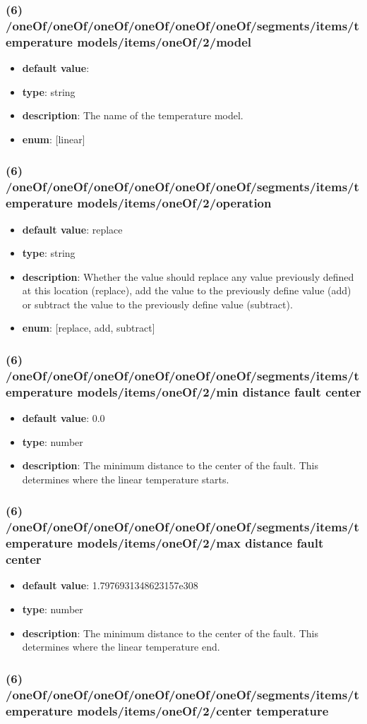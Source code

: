 \subsubsection{(6) /oneOf/oneOf/oneOf/oneOf/oneOf/oneOf/segments/items/temperature models/items/oneOf/2/model}
\begin{itemize}[leftmargin=6em]\item {\bf default value}: 
\item {\bf type}: string
\item {\bf description}: The name of the temperature model.
\item {\bf enum}: [linear]\end{itemize}\subsubsection{(6) /oneOf/oneOf/oneOf/oneOf/oneOf/oneOf/segments/items/temperature models/items/oneOf/2/operation}
\begin{itemize}[leftmargin=6em]\item {\bf default value}: replace
\item {\bf type}: string
\item {\bf description}: Whether the value should replace any value previously defined at this location (replace), add the value to the previously define value (add) or subtract the value to the previously define value (subtract).
\item {\bf enum}: [replace, add, subtract]\end{itemize}\subsubsection{(6) /oneOf/oneOf/oneOf/oneOf/oneOf/oneOf/segments/items/temperature models/items/oneOf/2/min distance fault center}
\begin{itemize}[leftmargin=6em]\item {\bf default value}: 0.0
\item {\bf type}: number
\item {\bf description}: The minimum distance to the center of the fault. This determines where the linear temperature starts.
\end{itemize}\subsubsection{(6) /oneOf/oneOf/oneOf/oneOf/oneOf/oneOf/segments/items/temperature models/items/oneOf/2/max distance fault center}
\begin{itemize}[leftmargin=6em]\item {\bf default value}: 1.7976931348623157e308
\item {\bf type}: number
\item {\bf description}: The minimum distance to the center of the fault. This determines where the linear temperature end.
\end{itemize}\subsubsection{(6) /oneOf/oneOf/oneOf/oneOf/oneOf/oneOf/segments/items/temperature models/items/oneOf/2/center temperature}
